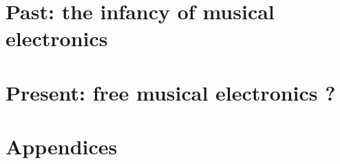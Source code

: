 



\clearpage %
\part{Past: the infancy of musical electronics}  %



\clearpage
\part{Present: free musical electronics ?}







%


\appendix %

\part{Appendices}

%
%

